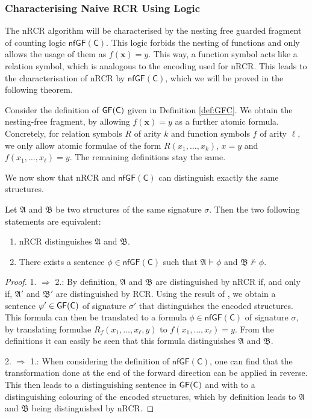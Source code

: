 \subsubsection{Characterising Naive RCR Using Logic} 

The nRCR algorithm will be characterised by the nesting free guarded fragment of counting logic $\mathsf{nfGF}(\mathsf C)$.
This logic forbids the nesting of functions and only allows the usage of them as $f(\mathbf x)=y$.
This way, a function symbol acts like a relation symbol, which is analogous to the encoding used for nRCR. 
This leads to the characterisation of nRCR by $\mathsf{nfGF}(\mathsf C)$, which we will be proved in the following theorem.

\begin{definition}
	Consider the definition of $\mathsf{GF}(\mathsf{C})$ given in Definition \ref{def:GFC}.
	We obtain the nesting-free fragment, by allowing $f(\mathbf x)=y$ as a further atomic formula.
	Concretely, for relation symbols $R$ of arity $k$ and function symbols $f$ of arity $\ell$, we only allow atomic formulae of the form $R(x_1,\dots,x_k)$, $x=y$ and $f(x_1,\dots,x_\ell)=y$.
	The remaining definitions stay the same.
\end{definition}

We now show that nRCR and $\mathsf{nfGF}(\mathsf C)$ can distinguish exactly the same structures.

\begin{theorem}
	\label{thm:ThmA}
	Let $\mathfrak A$ and $\mathfrak B$ be two structures of the same signature $\sigma$.
	Then the two following statements are equivalent:
	\begin{enumerate}
		\item nRCR distinguishes $\mathfrak A$ and $\mathfrak B$.
		\item There exists a sentence $\phi\in \mathsf{nfGF}(\mathsf C)$ such that $\mathfrak A\models \phi$ and $\mathfrak B\not\models \phi$.
	\end{enumerate}
\end{theorem}
\begin{proof}
	1. $\Rightarrow$ 2.:
	By definition, $\mathfrak A$ and $\mathfrak B$ are distinguished by nRCR if, and only if, $\mathfrak A'$ and $\mathfrak B'$ are distinguished by RCR.
	Using the result of \cite{scheidt2025ColorRefinement}, we obtain a sentence $\varphi'\in\mathsf{GF}(\mathsf{C})$ of signature $\sigma'$ that distinguishes the encoded structures.
	This formula can then be translated to a formula $\phi\in \mathsf{nfGF}(\mathsf C)$ of signature $\sigma$, by translating formulae $R_f(x_1,\dots,x_\ell,y)$ to $f(x_1,\dots,x_\ell)=y$.
	From the definitions it can easily be seen that this formula distinguishes $\mathfrak A$ and $\mathfrak B$.
	
	2. $\Rightarrow$ 1.:
	When considering the definition of $\mathsf{nfGF}(\mathsf C)$, one can find that the transformation done at the end of the forward direction can be applied in reverse.
	This then leads to a distinguishing sentence in $\mathsf{GF}(\mathsf{C})$ and with \cite{scheidt2025ColorRefinement} to a distinguishing colouring of the encoded structures, which by definition leads to $\mathfrak A$ and $\mathfrak B$ being distinguished by nRCR.
\end{proof}

